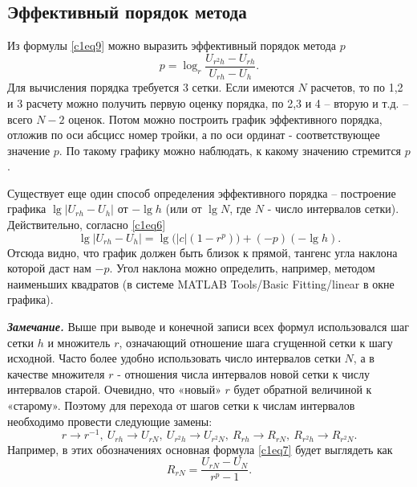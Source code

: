\subsection{Эффективный порядок метода}
Из формулы \eqref{c1eq9} можно выразить эффективный порядок метода $p$
\begin{equation} \label{c1eq13}
	p = \log_r \frac{U_{r^2h} - U_{rh}}{U_{rh} - U_h}.
\end{equation}
Для вычисления порядка требуется 3 сетки. Если имеются $N$ расчетов, то по 1,2 и 3 расчету можно получить первую оценку порядка, по 2,3 и 4 – вторую и т.д. – всего $N-2$ оценок. Потом можно построить график эффективного порядка, отложив по оси абсцисс номер тройки, а по оси ординат - соответствующее значение $p$. По такому графику можно наблюдать, к какому значению стремится $p$.

Существует еще один способ определения эффективного порядка – построение графика $\lg\left| U_{rh} - U_h \right|$ от $-\lg h$ (или от $\lg N$, где $N$ - число интервалов сетки). Действительно, согласно \eqref{c1eq6}
\begin{equation} \label{c1eq14}
	\lg \left| U_{rh} - U_h \right| = \lg \big( \left| c \right| \left( 1 - r^p \right) \big) + \left( -p \right) \left( - \lg h \right).
\end{equation}
Отсюда видно, что график должен быть близок к прямой, тангенс угла наклона которой даст нам $-p$. Угол наклона можно определить, например, методом наименьших квадратов (в системе MATLAB Tools/Basic Fitting/linear в окне графика). 

\textit{\textbf{Замечание.}} Выше при выводе и конечной записи всех формул использовался шаг сетки $h$ и множитель $r$, означающий отношение шага сгущенной сетки к шагу исходной. Часто более удобно использовать число интервалов сетки $N$, а в качестве множителя $r$ - отношения числа интервалов новой сетки к числу интервалов старой. Очевидно, что «новый» $r$ будет обратной величиной к «старому». Поэтому для перехода от шагов сетки к  числам интервалов необходимо провести следующие замены:
\begin{equation} \label{c1eq15}
	r \rightarrow r^{-1}, \ U_{rh} \rightarrow U_{rN}, \ U_{r^2h} \rightarrow U_{r^2N}, \ R_{rh} \rightarrow R_{rN}, \ R_{r^2h} \rightarrow R_{r^2N}.
\end{equation}
Например, в этих обозначениях основная формула \eqref{c1eq7} будет выглядеть как
\begin{equation} \label{c1eq16}
	R_{rN} = \frac{U_{rN} - U_N}{r^p - 1}.
\end{equation}

